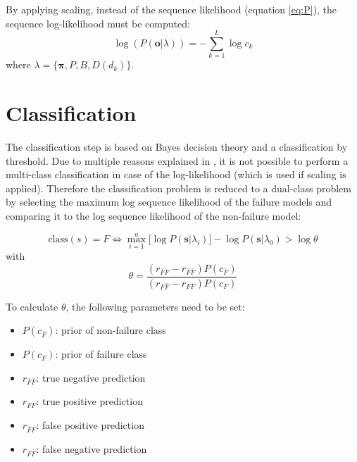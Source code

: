 \documentclass[mscthesis]{usiinfthesis}
\begin{document}
By applying scaling, instead of the sequence likelihood (equation \ref{eq:P}),
the sequence log-likelihood must be computed:
\begin{equation}
    \label{eq:Plog}
    \log(P(\boldsymbol{o}|\lambda)) = -\sum\limits_{k=1}^{L} \log c_k
\end{equation}
where $ \lambda = \{\boldsymbol{\pi}, P, B, D(d_k) \} $.

\section{Classification}
\label{ch:event_class}

The classification step is based on Bayes decision theory and a classification
by threshold. Due to multiple reasons explained in \cite{salfner08}, it is not
possible to perform a multi-class classification in case of the log-likelihood
(which is used if scaling is applied). Therefore the classification problem is
reduced to a dual-class problem by selecting the maximum log sequence
likelihood of the failure models and comparing it to the log sequence
likelihood of the non-failure model:

\begin{equation}
    \label{eq:class}
    \text{class}(s) = F \iff \max_{i=1}^{u} \big [
        \log P(\boldsymbol{s}|\lambda_i)
    \big ] - \log P(\boldsymbol{s}|\lambda_0) > \log \theta
\end{equation}
with
\begin{equation}
    \label{eq:class_thresh}
    \theta = \frac{(r_{\bar{F}F} - r_{\bar{F}\bar{F}})P(c_{\bar{F}})}
        {(r_{F \bar{F}} - r_{FF})P(c_{F})}
\end{equation}

To calculate $ \theta $, the following parameters need to be set:
\begin{itemize}
    \item $ P(c_{\bar{F}}) $: prior of non-failure class
    \item $ P(c_F) $: prior of failure class
    \item $ r_{\bar{F}\bar{F}} $: true negative prediction
    \item $ r_{FF} $: true positive prediction
    \item $ r_{\bar{F}F} $: false positive prediction
    \item $ r_{F\bar{F}} $: false negative prediction
\end{itemize}
\end{document}
